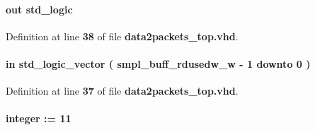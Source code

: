 \paragraph[{smpl\+\_\+buff\+\_\+rdreq}]{ {\bfseries \textcolor{keywordflow}{out}\textcolor{vhdlchar}{ }} {\bfseries \textcolor{comment}{std\+\_\+logic}\textcolor{vhdlchar}{ }} \hspace{0.3cm}{\ttfamily [Port]}}\label{classdata2packets__top_aab9bf8ed90bf34ef793eb8051d55ce6a}


Definition at line {\bf 38} of file {\bf data2packets\+\_\+top.\+vhd}.

\paragraph[{smpl\+\_\+buff\+\_\+rdusedw}]{ {\bfseries \textcolor{keywordflow}{in}\textcolor{vhdlchar}{ }} {\bfseries \textcolor{comment}{std\+\_\+logic\+\_\+vector}\textcolor{vhdlchar}{ }\textcolor{vhdlchar}{(}\textcolor{vhdlchar}{ }\textcolor{vhdlchar}{ }\textcolor{vhdlchar}{ }\textcolor{vhdlchar}{ }{\bfseries {\bf smpl\+\_\+buff\+\_\+rdusedw\+\_\+w}} \textcolor{vhdlchar}{-\/}\textcolor{vhdlchar}{ } \textcolor{vhdldigit}{1} \textcolor{vhdlchar}{ }\textcolor{keywordflow}{downto}\textcolor{vhdlchar}{ }\textcolor{vhdlchar}{ } \textcolor{vhdldigit}{0} \textcolor{vhdlchar}{ }\textcolor{vhdlchar}{)}\textcolor{vhdlchar}{ }} \hspace{0.3cm}{\ttfamily [Port]}}\label{classdata2packets__top_a6f26ef169cfeb79400e9ea88042643a8}


Definition at line {\bf 37} of file {\bf data2packets\+\_\+top.\+vhd}.

\paragraph[{smpl\+\_\+buff\+\_\+rdusedw\+\_\+w}]{ {\bfseries \textcolor{vhdlchar}{ }} {\bfseries \textcolor{comment}{integer}\textcolor{vhdlchar}{ }\textcolor{vhdlchar}{ }\textcolor{vhdlchar}{\+:}\textcolor{vhdlchar}{=}\textcolor{vhdlchar}{ }\textcolor{vhdlchar}{ } \textcolor{vhdldigit}{11} \textcolor{vhdlchar}{ }} \hspace{0.3cm}{\ttfamily [Generic]}}\label{classdata2packets__top_a63e1867c450c7e0d7330b9663f55907b}



